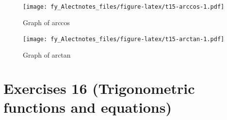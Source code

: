 \documentclass[
  12pt,
  oneside]{book}
\theoremstyle{definition}
\theoremstyle{definition}
\theoremstyle{definition}
\theoremstyle{definition}
\theoremstyle{remark}
\begin{document}
\begin{figure}
\centering
\texttt{[image: fy\_Alectnotes\_files/figure-latex/t15-arccos-1.pdf]}
\caption{\label{fig:t15-arccos}Graph of arccos}
\end{figure}

\begin{figure}
\centering
\texttt{[image: fy\_Alectnotes\_files/figure-latex/t15-arctan-1.pdf]}
\caption{\label{fig:t15-arctan}Graph of arctan}
\end{figure}

\hypertarget{exercises-16-trigonometric-functions-and-equations}{%
\chapter*{Exercises 16 (Trigonometric functions and equations)}\label{exercises-16-trigonometric-functions-and-equations}}
\end{document}
